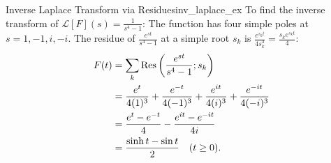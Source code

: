 \begin{example}{Inverse Laplace Transform via Residues}{inv_laplace_ex}
To find the inverse transform of $\mathcal{L}[F](s) = \frac{1}{s^4 - 1}$:
The function has four simple poles at $s = 1, -1, i, -i$.
The residue of $\frac{e^{st}}{s^4 - 1}$ at a simple root $s_k$ is $\frac{e^{s_k t}}{4 s_k^3} = \frac{s_k e^{s_k t}}{4}$:
\begin{align}
F(t) &= \sum_{k} \operatorname{Res}\left(\frac{e^{st}}{s^4 - 1}; s_k\right) \nonumber \\
     &= \frac{e^t}{4(1)^3} + \frac{e^{-t}}{4(-1)^3} + \frac{e^{it}}{4(i)^3} + \frac{e^{-it}}{4(-i)^3} \nonumber \\
     &= \frac{e^t - e^{-t}}{4} - \frac{e^{it} - e^{-it}}{4i} \nonumber \\
     &= \frac{\sinh t - \sin t}{2} \quad (t \ge 0).
\end{align}
\end{example}
